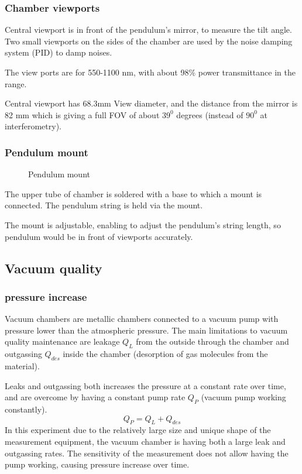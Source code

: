 \documentclass[\main/master.tex]{subfiles}
\begin{document}
\subsubsection{Chamber viewports}
\par\noindent
Central viewport is in front of the pendulum's mirror, to measure the tilt angle. Two small viewports on the sides of the chamber are used by the noise damping system (PID) to damp noises. 
\par\noindent
The view ports are for 550-1100 nm, with about 98$\%$ power transmittance in the range.
\par\noindent
Central viewport has 68.3mm View diameter, and the distance from the mirror is 82 mm which is giving a full FOV of about $39^0$ degrees (instead of $90^0$ at interferometry).

\subsubsection{Pendulum mount}
\begin{figure}[htbp]
	\centering
	\caption[Pendulum mount]{Pendulum mount}
	\label{fig:mount}
\end{figure}
\FloatBarrier
\par\noindent
The upper tube of chamber is soldered with a base to which a mount is connected. The pendulum string is held via the mount.
\par\noindent
The mount is adjustable, enabling to adjust the pendulum's string length, so pendulum would be in front of viewports accurately. 

\subsection{Vacuum quality}
\subsubsection{pressure increase}
\par\noindent
Vacuum chambers are metallic chambers connected to a vacuum pump with pressure lower than the atmospheric pressure. The main limitations to vacuum quality maintenance are leakage $Q_L$ from the outside through the chamber and outgassing $Q_{des}$ inside the chamber (desorption of gas molecules from the material).
\par\noindent
Leaks and outgassing both increases the pressure at a constant rate over time, and are overcome by having a constant pump rate $Q_P$ (vacuum pump working constantly).   
\begin{equation}
Q_P = Q_L + Q_{des}  \label{eqn:vacuum_equilibrium}
\end{equation}
In this experiment due to the relatively large size and unique shape of the measurement equipment, the vacuum chamber is having both a large leak and outgassing rates. The sensitivity of the measurement does not allow having the pump working, causing pressure increase over time.
\end{document}
